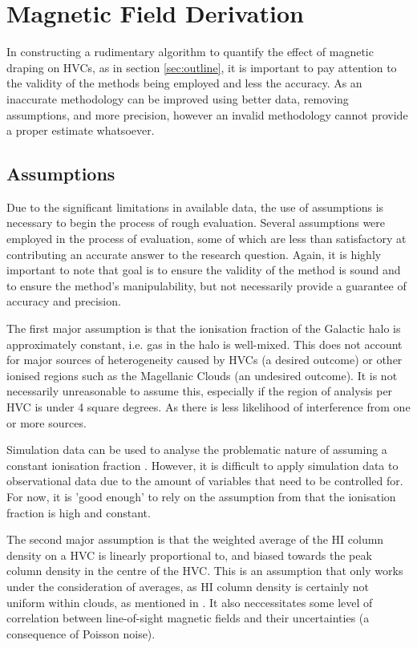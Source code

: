 \chapter{Magnetic Field Derivation}
\label{cha:derivation}

In constructing a rudimentary algorithm to quantify the effect of magnetic draping on HVCs, as in section \ref{sec:outline}, it is important to pay attention to the validity of the methods being employed and less the accuracy. As an inaccurate methodology can be improved using better data, removing assumptions, and more precision, however an invalid methodology cannot provide a proper estimate whatsoever.

\section{Assumptions}
\label{sec:assumptions}

Due to the significant limitations in available data, the use of assumptions is necessary to begin the process of rough evaluation. Several assumptions were employed in the process of evaluation, some of which are less than satisfactory at contributing an accurate answer to the research question. Again, it is highly important to note that goal is to ensure the validity of the method is sound and to ensure the method's manipulability, but not necessarily provide a guarantee of accuracy and precision.


The first major assumption is that the ionisation fraction of the Galactic halo is approximately constant, i.e. gas in the halo is well-mixed. This does not account for major sources of heterogeneity caused by HVCs (a desired outcome) or other ionised regions such as the Magellanic Clouds (an undesired outcome). It is not necessarily unreasonable to assume this, especially if the region of analysis per HVC is under 4 square degrees. As there is less likelihood of interference from one or more sources.


Simulation data can be used to analyse the problematic nature of assuming a constant ionisation fraction \citep{ID23}. However, it is difficult to apply simulation data to observational data due to the amount of variables that need to be controlled for. For now, it is 'good enough' to rely on the assumption from \cite{ID23} that the ionisation fraction is high and constant.


The second major assumption is that the weighted average of the HI column density on a HVC is linearly proportional to, and biased towards the peak column density in the centre of the HVC. This is an assumption that only works under the consideration of averages, as HI column density is certainly not uniform within clouds, as mentioned in \cite{ID69}. It also neccessitates some level of correlation between line-of-sight magnetic fields and their uncertainties (a consequence of Poisson noise).


